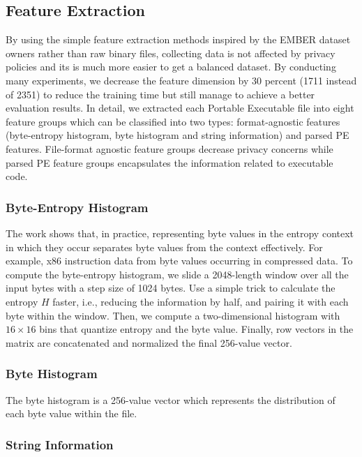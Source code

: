 \documentclass[runningheads]{llncs}
\begin{document}
\subsection{Feature Extraction}

By using the simple feature extraction methods inspired by the EMBER dataset owners rather than raw binary files, collecting data is not affected by privacy policies and its is much more easier to get a balanced dataset. By conducting many experiments, we decrease the feature dimension by 30 percent (1711 instead of 2351) to reduce the training time but still manage to achieve a better evaluation results. In detail, we extracted each Portable Executable file into eight feature groups which can be classified into two types: format-agnostic features (byte-entropy histogram, byte histogram and string information) and parsed PE features. File-format agnostic feature groups decrease privacy concerns while parsed PE feature groups encapsulates the information related to executable code.

\subsubsection{Byte-Entropy Histogram}

The work \cite{saxe2015deep} shows that, in practice, representing byte values in the entropy context in which they occur separates byte values from the context effectively. For example, x86 instruction data from byte values occurring in compressed data. To compute the byte-entropy histogram, we slide a 2048-length window over all the input bytes with a step size of 1024 bytes. Use a simple trick to calculate the entropy $H$ faster, i.e., reducing the information by half, and pairing it with each byte within the window. Then, we compute a two-dimensional histogram with $16 \times 16$ bins that quantize entropy and the byte value. Finally, row vectors in the matrix are concatenated and normalized the final 256-value vector.

\subsubsection{Byte Histogram}

The byte histogram is a 256-value vector which represents the distribution of each byte value within the file.

\subsubsection{String Information}
\end{document}
